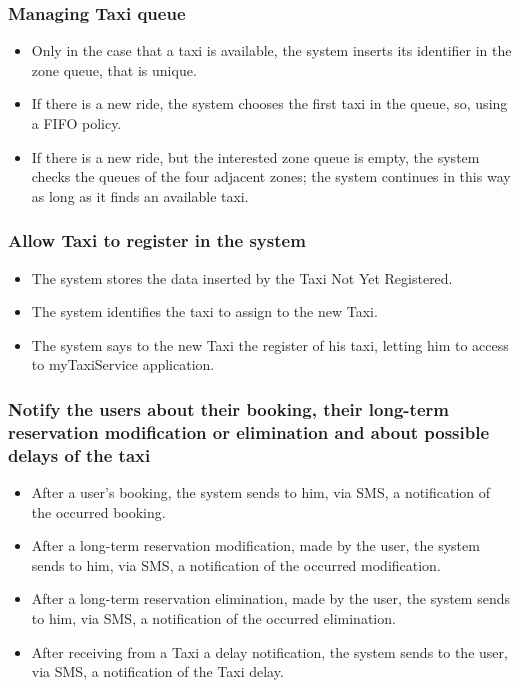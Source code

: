 		\subsubsection{Managing Taxi queue}
		\begin{itemize}
			\item Only in the case that a taxi is available, the system inserts its identifier in the zone queue, that is unique.
			\item If there is a new ride, the system chooses the first taxi in the queue, so, using a FIFO policy.
			\item If there is a new ride, but the interested zone queue is empty, the system checks the queues of the four adjacent zones; the system continues in this way as long as it finds an available taxi.
		\end{itemize}
		\subsubsection{Allow Taxi to register in the system}
		\begin{itemize}
			\item The system stores the data inserted by the Taxi Not Yet Registered.
			\item The system identifies the taxi to assign to the new Taxi.
			\item The system says to the new Taxi the register of his taxi, letting him to access to myTaxiService application.
		\end{itemize}
		\subsubsection{Notify the users about their booking, their long-term reservation modification or elimination and about possible delays of the taxi}
		\begin{itemize}
			\item After a user's booking, the system sends to him, via SMS, a notification of the occurred booking. 
			\item After a long-term reservation modification, made by the user, the system sends to him, via SMS, a notification of the occurred modification.
			\item After a long-term reservation elimination, made by the user, the system sends to him, via SMS, a notification of the occurred elimination.
			\item After receiving from a Taxi a delay notification, the system sends to the user, via SMS, a notification of the Taxi delay.
		\end{itemize}
